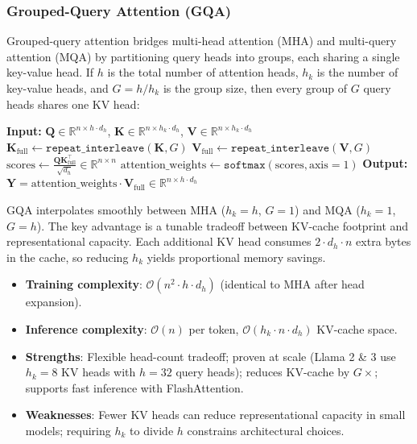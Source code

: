 \subsubsection{Grouped-Query Attention (GQA)}
Grouped-query attention \citep{ainslie_gqa_2023} bridges multi-head attention (MHA) and multi-query attention (MQA) by partitioning query heads into groups, each sharing a single key-value head. If $h$ is the total number of attention heads, $h_k$ is the number of key-value heads, and $G = h / h_k$ is the group size, then every group of $G$ query heads shares one KV head:

\begin{algorithmic}[1]
\State \textbf{Input:} $\mathbf{Q} \in \mathbb{R}^{n \times h \cdot d_h}$, $\mathbf{K} \in \mathbb{R}^{n \times h_k \cdot d_h}$, $\mathbf{V} \in \mathbb{R}^{n \times h_k \cdot d_h}$
\State $\mathbf{K}_{\text{full}} \gets \texttt{repeat\_interleave}(\mathbf{K}, G)$ 
\State $\mathbf{V}_{\text{full}} \gets \texttt{repeat\_interleave}(\mathbf{V}, G)$
\State $\text{scores} \gets \frac{\mathbf{Q}\mathbf{K}_{\text{full}}^\top}{\sqrt{d_h}} \in \mathbb{R}^{n \times n}$ 
\State $\text{attention\_weights} \gets \texttt{softmax}(\text{scores}, \text{axis}=1)$
\State \textbf{Output:} $\mathbf{Y} = \text{attention\_weights} \cdot \mathbf{V}_{\text{full}} \in \mathbb{R}^{n \times h \cdot d_h}$
\end{algorithmic}

GQA interpolates smoothly between MHA ($h_k = h$, $G = 1$) and MQA ($h_k = 1$, $G = h$). The key advantage is a tunable tradeoff between KV-cache footprint and representational capacity. Each additional KV head consumes $2 \cdot d_h \cdot n$ extra bytes in the cache, so reducing $h_k$ yields proportional memory savings.

\begin{itemize}[leftmargin=*]
    \item \textbf{Training complexity}: $\mathcal{O}(n^2 \cdot h \cdot d_h)$ (identical to MHA after head expansion).
    \item \textbf{Inference complexity}: $\mathcal{O}(n)$ per token, $\mathcal{O}(h_k \cdot n \cdot d_h)$ KV-cache space.
    \item \textbf{Strengths}: Flexible head-count tradeoff; proven at scale (Llama 2 \& 3 use $h_k = 8$ KV heads with $h = 32$ query heads); reduces KV-cache by $G \times$; supports fast inference with FlashAttention.
    \item \textbf{Weaknesses}: Fewer KV heads can reduce representational capacity in small models; requiring $h_k$ to divide $h$ constrains architectural choices.
\end{itemize}

